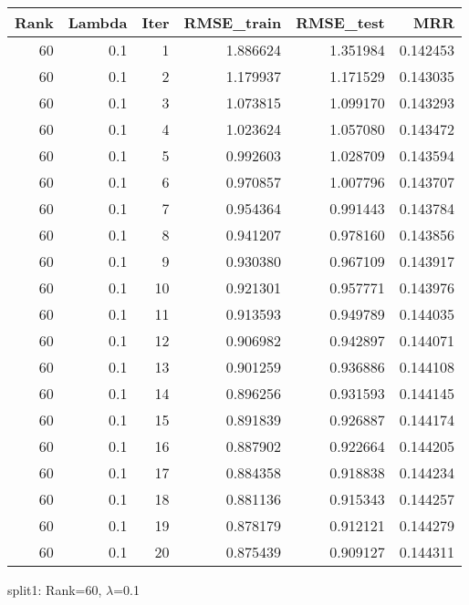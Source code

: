 \begin{tabular}{rrrrrr}
\toprule
 Rank &  Lambda &  Iter &  RMSE\_train &  RMSE\_test &       MRR \\
\midrule
   60 &     0.1 &     1 &    1.886624 &   1.351984 &  0.142453 \\
   60 &     0.1 &     2 &    1.179937 &   1.171529 &  0.143035 \\
   60 &     0.1 &     3 &    1.073815 &   1.099170 &  0.143293 \\
   60 &     0.1 &     4 &    1.023624 &   1.057080 &  0.143472 \\
   60 &     0.1 &     5 &    0.992603 &   1.028709 &  0.143594 \\
   60 &     0.1 &     6 &    0.970857 &   1.007796 &  0.143707 \\
   60 &     0.1 &     7 &    0.954364 &   0.991443 &  0.143784 \\
   60 &     0.1 &     8 &    0.941207 &   0.978160 &  0.143856 \\
   60 &     0.1 &     9 &    0.930380 &   0.967109 &  0.143917 \\
   60 &     0.1 &    10 &    0.921301 &   0.957771 &  0.143976 \\
   60 &     0.1 &    11 &    0.913593 &   0.949789 &  0.144035 \\
   60 &     0.1 &    12 &    0.906982 &   0.942897 &  0.144071 \\
   60 &     0.1 &    13 &    0.901259 &   0.936886 &  0.144108 \\
   60 &     0.1 &    14 &    0.896256 &   0.931593 &  0.144145 \\
   60 &     0.1 &    15 &    0.891839 &   0.926887 &  0.144174 \\
   60 &     0.1 &    16 &    0.887902 &   0.922664 &  0.144205 \\
   60 &     0.1 &    17 &    0.884358 &   0.918838 &  0.144234 \\
   60 &     0.1 &    18 &    0.881136 &   0.915343 &  0.144257 \\
   60 &     0.1 &    19 &    0.878179 &   0.912121 &  0.144279 \\
   60 &     0.1 &    20 &    0.875439 &   0.909127 &  0.144311 \\
\bottomrule
\end{tabular}

\caption{split1: Rank=60, $\lambda$=0.1}
